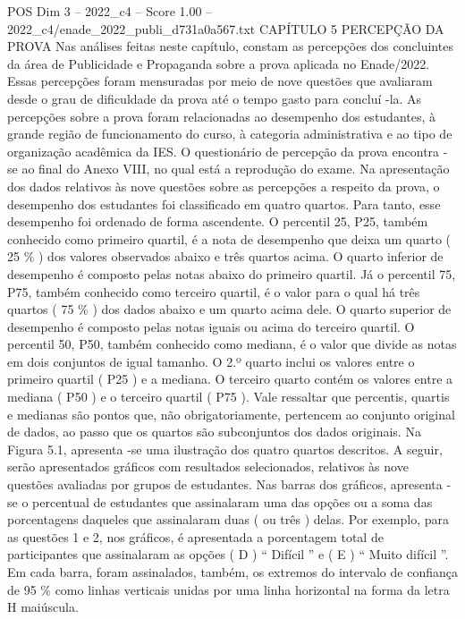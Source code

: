 \begin{textsample}{POS Dim 3 – 2022\_c4 – Score 1.00 – 2022\_c4/enade\_2022\_publi\_d731a0a567.txt}  \label{ex:f3_pos_180}
CAPÍTULO 5 PERCEPÇÃO DA PROVA Nas análises feitas neste capítulo, constam as percepções dos concluintes da área de Publicidade e Propaganda sobre a prova aplicada no Enade/2022.
Essas percepções foram mensuradas por meio de nove questões que avaliaram desde o grau de dificuldade da prova até o tempo gasto para concluí -la.
As percepções sobre a prova foram relacionadas ao desempenho dos estudantes, à grande região de funcionamento do curso, à categoria administrativa e ao tipo de organização acadêmica da IES.
O questionário de percepção da prova encontra -se ao final do Anexo VIII, no qual está a reprodução do exame.
Na apresentação dos dados relativos às nove questões sobre as percepções a respeito da prova, o desempenho dos estudantes foi classificado em quatro quartos.
Para tanto, esse desempenho foi ordenado de forma ascendente.
O percentil 25, P25, também conhecido como primeiro quartil, é a nota de desempenho que deixa um quarto ( 25 \% ) dos valores observados abaixo e três quartos acima.
O quarto inferior de desempenho é composto pelas notas abaixo do primeiro quartil.
Já o percentil 75, P75, também conhecido como terceiro quartil, é o valor para o qual há três quartos ( 75 \% ) dos dados abaixo e um quarto acima dele.
O quarto superior de desempenho é composto pelas notas iguais ou acima do terceiro quartil.
O percentil 50, P50, também conhecido como mediana, é o valor que divide as notas em dois conjuntos de igual tamanho.
O 2.º quarto inclui os valores entre o primeiro quartil ( P25 ) e a mediana.
O terceiro quarto contém os valores entre a mediana ( P50 ) e o terceiro quartil ( P75 ).
Vale ressaltar que percentis, quartis e medianas são pontos que, não obrigatoriamente, pertencem ao conjunto original de dados, ao passo que os quartos são subconjuntos dos dados originais.
Na Figura 5.1, apresenta -se uma ilustração dos quatro quartos descritos.
A seguir, serão apresentados gráficos com resultados selecionados, relativos às nove questões avaliadas por grupos de estudantes.
Nas barras dos gráficos, apresenta -se o percentual de estudantes que assinalaram uma das opções ou a soma das porcentagens daqueles que assinalaram duas ( ou três ) delas.
Por exemplo, para as questões 1 e 2, nos gráficos, é apresentada a porcentagem total de participantes que assinalaram as opções ( D ) “ Difícil ” e ( E ) “ Muito difícil ”.
Em cada barra, foram assinalados, também, os extremos do intervalo de confiança de 95 \% como linhas verticais unidas por uma linha horizontal na forma da letra H maiúscula.

\end{textsample}
